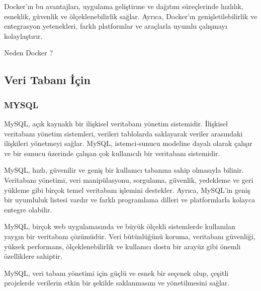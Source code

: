 Docker'ın bu avantajları, uygulama geliştirme ve dağıtım süreçlerinde hızlılık, esneklik, güvenlik ve ölçeklenebilirlik sağlar. Ayrıca, Docker'ın genişletilebilirlik ve entegrasyon yetenekleri, farklı platformlar ve araçlarla uyumlu çalışmayı kolaylaştırır.

Neden Docker ?\\
\subsection{Veri Tabanı İçin }
\subsubsection{MYSQL}
MySQL, açık kaynaklı bir ilişkisel veritabanı yönetim sistemidir. İlişkisel veritabanı yönetim sistemleri, verileri tablolarda saklayarak veriler arasındaki ilişkileri yönetmeyi sağlar. MySQL, istemci-sunucu modeline dayalı olarak çalışır ve bir sunucu üzerinde çalışan çok kullanıcılı bir veritabanı sistemidir.

MySQL, hızlı, güvenilir ve geniş bir kullanıcı tabanına sahip olmasıyla bilinir. Veritabanı yönetimi, veri manipülasyonu, sorgulama, güvenlik, yedekleme ve geri yükleme gibi birçok temel veritabanı işlemini destekler. Ayrıca, MySQL'in geniş bir uyumluluk listesi vardır ve farklı programlama dilleri ve platformlarla kolayca entegre olabilir.

MySQL, birçok web uygulamasında ve büyük ölçekli sistemlerde kullanılan yaygın bir veritabanı çözümüdür. Veri bütünlüğünü koruma, veritabanı güvenliği, yüksek performans, ölçeklenebilirlik ve kullanıcı dostu bir arayüz gibi önemli özelliklere sahiptir.

MySQL, veri tabanı yönetimi için güçlü ve esnek bir seçenek olup, çeşitli projelerde verilerin etkin bir şekilde saklanmasını ve yönetilmesini sağlar.


